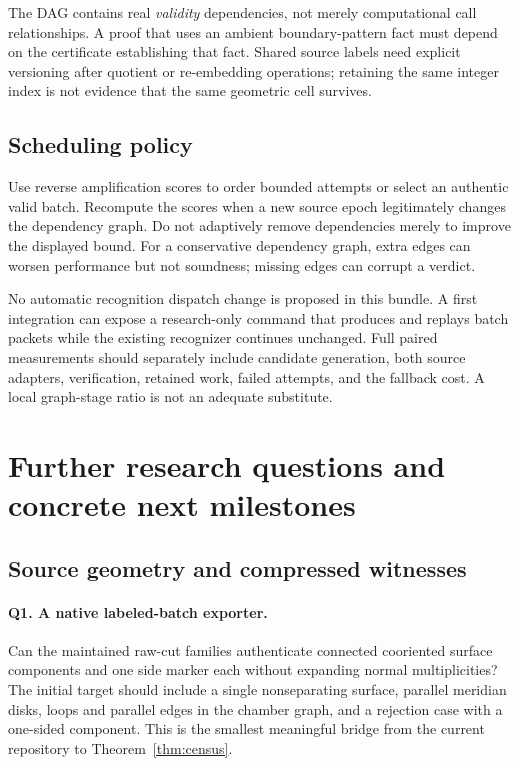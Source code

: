 \documentclass[11pt]{article}
\theoremstyle{definition}
\begin{document}
The DAG contains real \emph{validity} dependencies, not merely computational call relationships. A proof that uses an ambient boundary-pattern fact must depend on the certificate establishing that fact. Shared source labels need explicit versioning after quotient or re-embedding operations; retaining the same integer index is not evidence that the same geometric cell survives.

\subsection{Scheduling policy}
Use reverse amplification scores to order bounded attempts or select an authentic valid batch. Recompute the scores when a new source epoch legitimately changes the dependency graph. Do not adaptively remove dependencies merely to improve the displayed bound. For a conservative dependency graph, extra edges can worsen performance but not soundness; missing edges can corrupt a verdict.

No automatic recognition dispatch change is proposed in this bundle. A first integration can expose a research-only command that produces and replays batch packets while the existing recognizer continues unchanged. Full paired measurements should separately include candidate generation, both source adapters, verification, retained work, failed attempts, and the fallback cost. A local graph-stage ratio is not an adequate substitute.

\section{Further research questions and concrete next milestones}\label{sec:future}
\subsection{Source geometry and compressed witnesses}
\paragraph{Q1. A native labeled-batch exporter.}
Can the maintained raw-cut families authenticate connected cooriented surface components and one side marker each without expanding normal multiplicities? The initial target should include a single nonseparating surface, parallel meridian disks, loops and parallel edges in the chamber graph, and a rejection case with a one-sided component. This is the smallest meaningful bridge from the current repository to Theorem~\ref{thm:census}.
\end{document}
